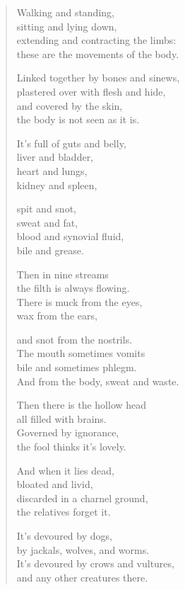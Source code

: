 \documentclass[12pt,openany]{book}%
\begin{document}
\begin{verse}%
Walking and standing, \\
sitting and lying down, \\
extending and contracting the limbs: \\
these are the movements of the body. 

Linked together by bones and sinews, \\
plastered over with flesh and hide, \\
and covered by the skin, \\
the body is not seen as it is. 

It’s full of guts and belly, \\
liver and bladder, \\
heart and lungs, \\
kidney and spleen, 

spit and snot, \\
sweat and fat, \\
blood and synovial fluid, \\
bile and grease. 

Then in nine streams \\
the filth is always flowing. \\
There is muck from the eyes, \\
wax from the ears, 

and snot from the nostrils. \\
The mouth sometimes vomits \\
bile and sometimes phlegm. \\
And from the body, sweat and waste. 

Then there is the hollow head \\
all filled with brains. \\
Governed by ignorance, \\
the fool thinks it’s lovely. 

And when it lies dead, \\
bloated and livid, \\
discarded in a charnel ground, \\
the relatives forget it. 

It’s devoured by dogs, \\
by jackals, wolves, and worms. \\
It’s devoured by crows and vultures, \\
and any other creatures there. 


\end{verse}
\end{document}
